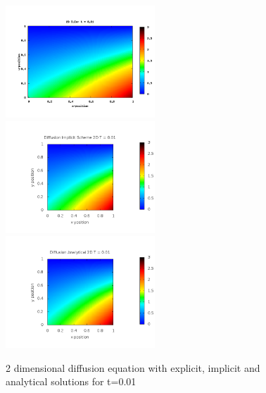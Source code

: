 \documentclass[a4wide,12pt]{article}
\begin{document}
\begin{figure}[p]
 \includegraphics[width=0.5\textwidth]{euler2d001}
 \includegraphics[width=0.5\textwidth]{Implicit2DT0_01}
 \includegraphics[width=0.5\textwidth]{Analytical2DT0_01}
 \caption{2 dimensional diffusion equation with explicit, implicit and analytical solutions for t=0.01}
 \label{fig:08}
 \end{figure}
 
\end{document}
